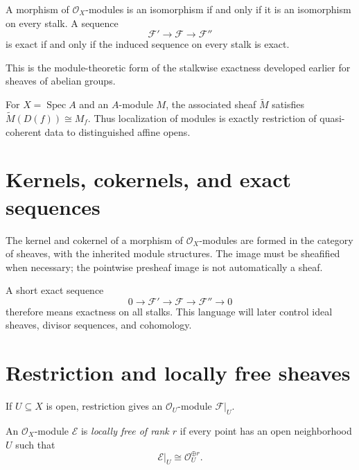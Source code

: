 \begin{theorem}
A morphism of $\mathcal O_X$-modules is an isomorphism if and only if it is an isomorphism on every stalk.  A sequence
\[
\mathcal F'\longrightarrow\mathcal F\longrightarrow\mathcal F''
\]
is exact if and only if the induced sequence on every stalk is exact.
\end{theorem}

This is the module-theoretic form of the stalkwise exactness developed earlier for sheaves of abelian groups.



\begin{example}\label{ex:vi33-expand-01}
For $X=\operatorname{Spec}A$ and an $A$-module $M$, the associated sheaf $\widetilde M$ satisfies $\widetilde M(D(f))\cong M_f$.  Thus localization of modules is exactly restriction of quasi-coherent data to distinguished affine opens.
\end{example}
\section{Kernels, cokernels, and exact sequences}
The kernel and cokernel of a morphism of $\mathcal O_X$-modules are formed in the category of sheaves, with the inherited module structures.  The image must be sheafified when necessary; the pointwise presheaf image is not automatically a sheaf.

A short exact sequence
\[
0\longrightarrow\mathcal F'\longrightarrow\mathcal F\longrightarrow\mathcal F''\longrightarrow0
\]
therefore means exactness on all stalks.  This language will later control ideal sheaves, divisor sequences, and cohomology.

\section{Restriction and locally free sheaves}
If $U\subseteq X$ is open, restriction gives an $\mathcal O_U$-module $\mathcal F|_U$.

\begin{definition}
An $\mathcal O_X$-module $\mathcal E$ is \emph{locally free of rank $r$} if every point has an open neighborhood $U$ such that
\[
\mathcal E|_U\cong\mathcal O_U^{\oplus r}.
\]
\end{definition}

